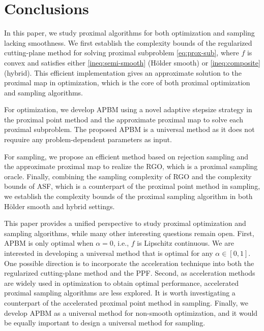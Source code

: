 \documentclass[11pt,letterpaper]{article}
\begin{document}






\section{Conclusions}\label{sec:conclusion}

In this paper, we study proximal algorithms for both optimization and sampling lacking smoothness.
We first establish the complexity bounds of the regularized cutting-plane method for solving proximal subproblem \eqref{eq:prox-sub}, where $f$ is convex and satisfies either \eqref{ineq:semi-smooth} (Hölder smooth) or \eqref{ineq:composite} (hybrid). This efficient implementation gives an approximate solution to the proximal map in optimization, which is the core of both proximal optimization and sampling algorithms.

For optimization, we develop APBM using a novel adaptive stepsize strategy in the proximal point method and the approximate proximal map to solve each proximal subproblem. The proposed APBM is a universal method as it does not requuire any problem-dependent parameters as input.

For sampling, we propose an efficient method based on rejection sampling and the approximate proximal map to realize the RGO, which is a proximal sampling oracle. Finally, combining the sampling complexity of RGO and the complexity bounds of ASF, which is a counterpart of the proximal point method in sampling, we establish the complexity bounds of the proximal sampling algorithm in both Hölder smooth and hybrid settings.

This paper provides a unified perspective to study proximal optimization and sampling algorithms, while many other interesting questions remain open.
First, APBM is only optimal when $\alpha=0$, i.e., $f$ is Lipschitz continuous. We are interested in developing a universal method that is optimal for any $\alpha\in [0,1]$. 
One possible direction is to incorporate the acceleration technique into both the regularized cutting-plane method and the PPF.
Second, as acceleration methods are widely used in optimization to obtain optimal performance, accelerated proximal sampling algorithms are less explored. It is worth investigating a counterpart of the accelerated proximal point method \cite{MonteiroSvaiterAcceleration} in sampling.
Finally, we develop APBM as a universal method for non-smooth optimization, and it would be equally important to design a universal method for sampling.
\end{document}
